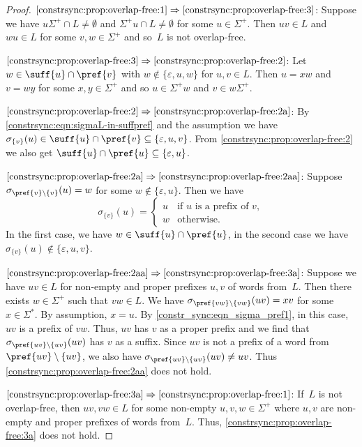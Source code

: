 \begin{proof}
$\ref{constrsync:prop:overlap-free:1} \Rightarrow \ref{constrsync:prop:overlap-free:3}$:  Suppose we have $u\Sigma^+ \cap L \ne \emptyset$
and $\Sigma^+u \cap L \ne \emptyset$ for some $u \in \Sigma^+$.
Then $uv \in L$ and $wu \in L$ for some $v,w \in \Sigma^+$ and so~$L$ is not overlap-free.

$\ref{constrsync:prop:overlap-free:3} \Rightarrow \ref{constrsync:prop:overlap-free:2}$: 
Let $w \in \suff{u} \cap \pref{v}$
with $w \notin\{\varepsilon,u,w\}$ for $u,v \in L$.
Then $u = xw$ and $v = wy$ for some $x,y \in \Sigma^+$ and so $u \in \Sigma^+w$ and $v \in w\Sigma^+$.

$\ref{constrsync:prop:overlap-free:2} \Rightarrow \ref{constrsync:prop:overlap-free:2a}$: 
By \cref{constrsync:eqn:sigmaL-in-suffpref} and the assumption we have $\sigma_{\{v\}}(u) \in \suff{u} \cap \pref{v} \subseteq \{\varepsilon, u, v\}$.
From \cref{constrsync:prop:overlap-free:2} we also get $\suff{u}\cap \pref{u} \subseteq \{\varepsilon, u\}$.

$\ref{constrsync:prop:overlap-free:2a} \Rightarrow \ref{constrsync:prop:overlap-free:2aa}$: 
Suppose $\sigma_{\pref{v}\setminus\{v\}}(u) = w$ for some $w \notin \{\varepsilon, u\}$.
Then we have
\[
\sigma_{\{v\}}(u) = 
\begin{cases}
u & \text{if $u$ is a prefix of~$v$}, \\
w & \text{otherwise.}
\end{cases}
\]
In the first case, we have $w \in \suff{u}\cap \pref{u}$, in the second 
case we have $\sigma_{\{v\}}(u) \notin \{\varepsilon, u, v\}$.

$\ref{constrsync:prop:overlap-free:2aa} \Rightarrow \ref{constrsync:prop:overlap-free:3a}$:
Suppose we have $uv \in L$ for non-empty and proper prefixes $u,v$ of words from~$L$.
Then there exists $w \in \Sigma^+$ such that $vw \in L$.
We have $\sigma_{\pref{vw}\setminus\{vw\}}(uv) = xv$ for some $x \in \Sigma^*$.
By assumption, $x = u$. By \cref{constr_sync:eqn_sigma_pref1}, in this case, $uv$ is a prefix of $vw$.
Thus, $uv$ has $v$ as a proper prefix and 
we find that $\sigma_{\pref{uv}\setminus\{uv\}}(uv)$
has $v$ as a suffix.
Since $uv$ is not a prefix of a word from $\pref{uv}\setminus\{uv\}$,
we also have $\sigma_{\pref{uv}\setminus\{uv\}}(uv) \ne uv$.
Thus \cref{constrsync:prop:overlap-free:2aa} does not hold.

$\ref{constrsync:prop:overlap-free:3a} \Rightarrow \ref{constrsync:prop:overlap-free:1}$: 
 If~$L$ is not overlap-free, then $uv, vw \in L$ for some non-empty $u,v,w \in \Sigma^+$ where
 $u,v$ are non-empty and proper prefixes of words from~$L$.
 Thus, \cref{constrsync:prop:overlap-free:3a} does not hold.
\end{proof}

